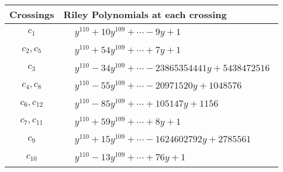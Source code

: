 \documentclass[1p]{elsarticle_modified}
\theoremstyle{definition}
\begin{document}
\begin{tabular}{m{50pt}|m{274pt}}
Crossings & \hspace{64pt}Riley Polynomials at each crossing \\
\hline $$\begin{aligned}c_{1}\end{aligned}$$&$\begin{aligned}
&y^{110}+10 y^{109}+\cdots-9 y+1
\end{aligned}$\\
\hline $$\begin{aligned}c_{2},c_{5}\end{aligned}$$&$\begin{aligned}
&y^{110}+54 y^{109}+\cdots+7 y+1
\end{aligned}$\\
\hline $$\begin{aligned}c_{3}\end{aligned}$$&$\begin{aligned}
&y^{110}-34 y^{109}+\cdots-23865354441 y+5438472516
\end{aligned}$\\
\hline $$\begin{aligned}c_{4},c_{8}\end{aligned}$$&$\begin{aligned}
&y^{110}-55 y^{109}+\cdots-20971520 y+1048576
\end{aligned}$\\
\hline $$\begin{aligned}c_{6},c_{12}\end{aligned}$$&$\begin{aligned}
&y^{110}-85 y^{109}+\cdots+105147 y+1156
\end{aligned}$\\
\hline $$\begin{aligned}c_{7},c_{11}\end{aligned}$$&$\begin{aligned}
&y^{110}+59 y^{109}+\cdots+8 y+1
\end{aligned}$\\
\hline $$\begin{aligned}c_{9}\end{aligned}$$&$\begin{aligned}
&y^{110}+15 y^{109}+\cdots-1624602792 y+2785561
\end{aligned}$\\
\hline $$\begin{aligned}c_{10}\end{aligned}$$&$\begin{aligned}
&y^{110}-13 y^{109}+\cdots+76 y+1
\end{aligned}$\\
\hline
\end{tabular}\\~\\
\end{document}
